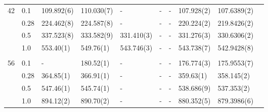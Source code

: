 {\begin{landscape}
\begin{table}
\begin{tabularx}{\hsize}{llR{2.3cm}R{2.3cm}R{2.3cm}R{2.3cm}R{2.3cm}R{2.3cm}R{2.3cm}R{2.1cm}}
		42 & 0.1 & 109.892(6) & 110.030(7) & - & - & - &  107.928(2) & 107.6389(2) \\ 
		& 0.28 & 224.462(8) & 224.587(8) & - & - & - & 220.224(2) & 219.8426(2) \\
		& 0.5 & 337.523(8) & 333.582(9) & 331.410(3) & - & - & 331.276(3) & 330.6306(2) \\
		& 1.0 & 553.40(1) & 549.76(1) & 543.746(3) & - & - & 543.738(7) & 542.9428(8) \\ \hdashline \\
		
		56 & 0.1 & - & 180.52(1) & - & - & - & 176.774(3) & 175.9553(7) \\ 
		& 0.28 & 364.85(1) & 366.91(1) & - & - & - & 359.63(1) & 358.145(2) \\
		& 0.5 & 547.46(1) & 545.74(1) & - & - & - & 538.686(9) & 537.353(2) \\
		& 1.0 & 894.12(2) & 890.70(2) & - & - & - & 880.352(5) & 879.3986(6) \\ \hline\hline
	\end{tabularx}
\end{table}


\end{landscape}}
